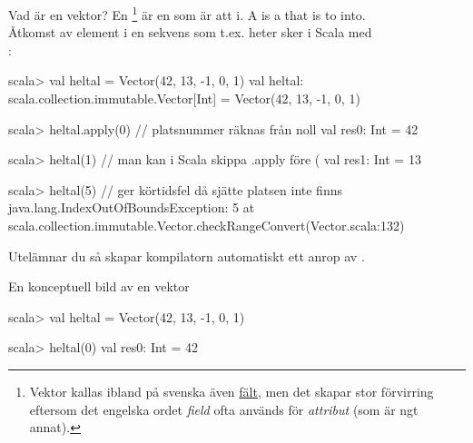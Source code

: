 \begin{Slide}{Vad är en vektor?}\SlideFontSmall
\ifswedish En \footnote{Vektor kallas ibland på svenska även \href{https://sv.wikipedia.org/wiki/F\%C3\%A4lt_\%28datastruktur\%29}{fält}, men det skapar stor förvirring eftersom det engelska ordet \emph{field} ofta används för \emph{attribut} (som är ngt annat).}
 är en  som är  att  i.\else
A  is a  that is  to  into.\fi
\\Åtkomst av element i en sekvens som t.ex. heter  sker i Scala med\\:

\begin{REPL}
scala> val heltal = Vector(42, 13, -1, 0, 1)
val heltal: scala.collection.immutable.Vector[Int] = Vector(42, 13, -1, 0, 1)

scala> heltal.apply(0)   // platsnummer räknas från noll
val res0: Int = 42

scala> heltal(1)         // man kan i Scala skippa .apply före (
val res1: Int = 13

scala> heltal(5)         // ger körtidsfel då sjätte platsen inte finns
java.lang.IndexOutOfBoundsException: 5
  at scala.collection.immutable.Vector.checkRangeConvert(Vector.scala:132)
\end{REPL}
Utelämnar du  så skapar kompilatorn automatiskt ett anrop av .
\end{Slide}

\begin{Slide}{En konceptuell bild av en vektor}

\begin{REPLnonum}
scala> val heltal = Vector(42, 13, -1, 0, 1)

scala> heltal(0)
val res0: Int = 42
\end{REPLnonum}


\end{Slide}




